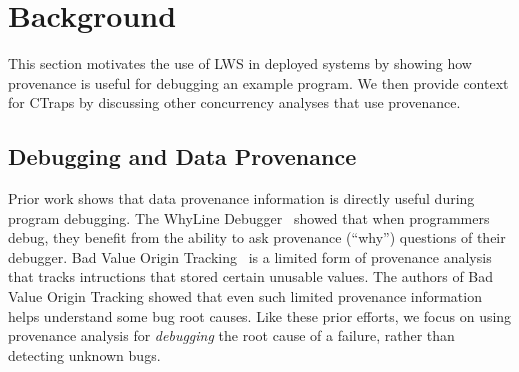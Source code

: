 \documentclass[10pt,nocopyrightspace]{sigplanconf}
\newcommand{\ctraps}{CTraps\xspace}
\newcommand{\lws}{LWS\xspace}
\begin{document}


\section{Background}

This section motivates the use of \lws in deployed systems by showing how
provenance is useful for debugging an example program.  We then provide context
for \ctraps by discussing other concurrency analyses that use provenance.


\subsection{Debugging and Data Provenance}

Prior work shows that data provenance information is directly useful during
program debugging.  The WhyLine Debugger~\cite{whylinechi,whylineicse} showed
that when programmers debug, they benefit from the ability to ask provenance
(``why'') questions of their debugger.  Bad Value Origin
Tracking~\cite{badapples} is a limited form of provenance analysis that tracks
intructions that stored certain unusable values.  The authors of Bad Value
Origin Tracking showed that even such limited provenance information helps
understand some bug root causes. Like these prior efforts, we focus on using
provenance analysis for {\em debugging} the root cause of a
failure, rather than detecting unknown bugs.
\end{document}
